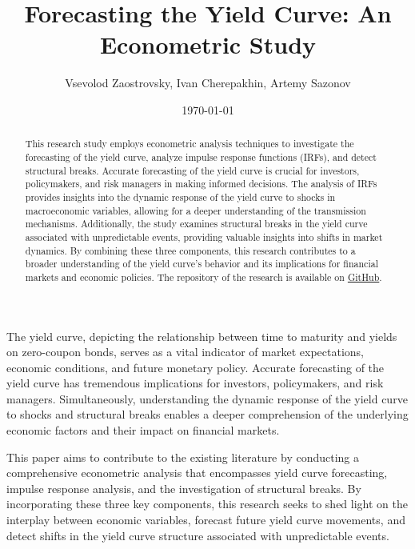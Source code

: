 \documentclass{vegaarticle}
\author{Vsevolod Zaostrovsky, Ivan Cherepakhin, Artemy Sazonov}
\title{Forecasting the Yield Curve: An Econometric Study}
\date{\today}
\begin{document}
    \maketitle

    \begin{abstract}{}
        This research study employs econometric analysis techniques to investigate the forecasting of the yield curve,
        analyze impulse response functions (IRFs), and detect structural breaks. Accurate forecasting of the yield curve
        is crucial for investors, policymakers, and risk managers in making informed decisions. The analysis of IRFs
        provides insights into the dynamic response of the yield curve to shocks in macroeconomic variables, allowing
        for a deeper understanding of the transmission mechanisms. Additionally, the study examines structural breaks in
        the yield curve associated with unpredictable events, providing valuable insights into shifts in market
        dynamics. By combining these three components, this research contributes to a broader understanding of the yield
        curve's behavior and its implications for financial markets and economic policies. The repository of the research 
        is available on \href{https://github.com/VsevolodZaostrovsky/FinancialEconometrics}{GitHub}.
    \end{abstract}

    \introduction
        The yield curve, depicting the relationship between time to maturity and yields on zero-coupon bonds, serves as
        a vital indicator of market expectations, economic conditions, and future monetary policy. Accurate forecasting
        of the yield curve has tremendous implications for investors, policymakers, and risk managers. Simultaneously,
        understanding the dynamic response of the yield curve to shocks and structural breaks enables a deeper
        comprehension of the underlying economic factors and their impact on financial markets.

        This paper aims to contribute to the existing literature by conducting a comprehensive econometric analysis that
        encompasses yield curve forecasting, impulse response analysis, and the investigation of structural breaks. By
        incorporating these three key components, this research seeks to shed light on the interplay between economic
        variables, forecast future yield curve movements, and detect shifts in the yield curve structure associated with
        unpredictable events.
        
\end{document}
